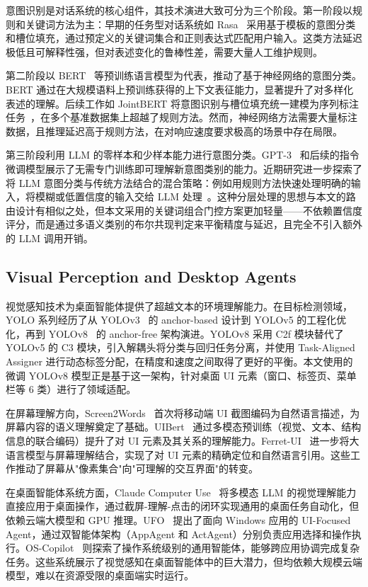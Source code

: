 意图识别是对话系统的核心组件，其技术演进大致可分为三个阶段。第一阶段以规则和关键词方法为主：早期的任务型对话系统如 Rasa~\cite{bocklisch2017rasa} 采用基于模板的意图分类和槽位填充，通过预定义的关键词集合和正则表达式匹配用户输入。这类方法延迟极低且可解释性强，但对表述变化的鲁棒性差，需要大量人工维护规则。

第二阶段以 BERT~\cite{devlin2019bert} 等预训练语言模型为代表，推动了基于神经网络的意图分类。BERT 通过在大规模语料上预训练获得的上下文表征能力，显著提升了对多样化表述的理解。后续工作如 JointBERT 将意图识别与槽位填充统一建模为序列标注任务~\cite{chen2019jointbert}，在多个基准数据集上超越了规则方法。然而，神经网络方法需要大量标注数据，且推理延迟高于规则方法，在对响应速度要求极高的场景中存在局限。

第三阶段利用 LLM 的零样本和少样本能力进行意图分类。GPT-3~\cite{brown2020gpt3} 和后续的指令微调模型展示了无需专门训练即可理解新意图类别的能力。近期研究进一步探索了将 LLM 意图分类与传统方法结合的混合策略：例如用规则方法快速处理明确的输入，将模糊或低置信度的输入交给 LLM 处理~\cite{arora2024intent}。这种分层处理的思想与本文的路由设计有相似之处，但本文采用的关键词组合门控方案更加轻量——不依赖置信度评分，而是通过多语义类别的布尔共现判定来平衡精度与延迟，且完全不引入额外的 LLM 调用开销。

\subsection{Visual Perception and Desktop Agents}\label{sec:visual}

视觉感知技术为桌面智能体提供了超越文本的环境理解能力。在目标检测领域，YOLO 系列经历了从 YOLOv3~\cite{redmon2018yolov3} 的 anchor-based 设计到 YOLOv5 的工程化优化，再到 YOLOv8~\cite{jocher2023yolov8} 的 anchor-free 架构演进。YOLOv8 采用 C2f 模块替代了 YOLOv5 的 C3 模块，引入解耦头将分类与回归任务分离，并使用 Task-Aligned Assigner 进行动态标签分配，在精度和速度之间取得了更好的平衡。本文使用的微调 YOLOv8 模型正是基于这一架构，针对桌面 UI 元素（窗口、标签页、菜单栏等 6 类）进行了领域适配。

在屏幕理解方向，Screen2Words~\cite{wang2021screen2words} 首次将移动端 UI 截图编码为自然语言描述，为屏幕内容的语义理解奠定了基础。UIBert~\cite{bai2021uibert} 通过多模态预训练（视觉、文本、结构信息的联合编码）提升了对 UI 元素及其关系的理解能力。Ferret-UI~\cite{you2024ferretui} 进一步将大语言模型与屏幕理解结合，实现了对 UI 元素的精确定位和自然语言引用。这些工作推动了屏幕从"像素集合"向"可理解的交互界面"的转变。

在桌面智能体系统方面，Claude Computer Use~\cite{anthropic2024computeruse} 将多模态 LLM 的视觉理解能力直接应用于桌面操作，通过截屏-理解-点击的闭环实现通用的桌面任务自动化，但依赖云端大模型和 GPU 推理。UFO~\cite{zhang2025ufo} 提出了面向 Windows 应用的 UI-Focused Agent，通过双智能体架构（AppAgent 和 ActAgent）分别负责应用选择和操作执行。OS-Copilot~\cite{wu2024oscopilot} 则探索了操作系统级别的通用智能体，能够跨应用协调完成复杂任务。这些系统展示了视觉感知在桌面智能体中的巨大潜力，但均依赖大规模云端模型，难以在资源受限的桌面端实时运行。

